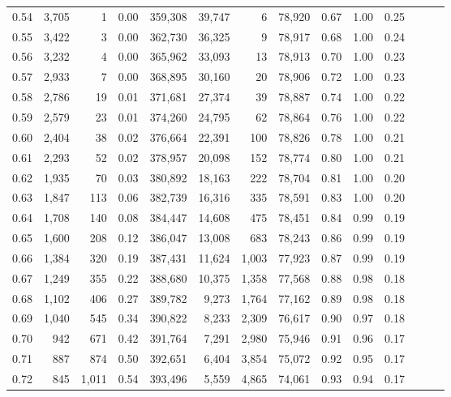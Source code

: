 \begin{tabular}{rrrrrrrrrrrrrr}
0.54 &  3,705 &      1 &  0.00 &  359,308 &   39,747 &       6 &  78,920 &  0.67 &  1.00 &      0.25 \\
0.55 &  3,422 &      3 &  0.00 &  362,730 &   36,325 &       9 &  78,917 &  0.68 &  1.00 &      0.24 \\
0.56 &  3,232 &      4 &  0.00 &  365,962 &   33,093 &      13 &  78,913 &  0.70 &  1.00 &      0.23 \\
0.57 &  2,933 &      7 &  0.00 &  368,895 &   30,160 &      20 &  78,906 &  0.72 &  1.00 &      0.23 \\
0.58 &  2,786 &     19 &  0.01 &  371,681 &   27,374 &      39 &  78,887 &  0.74 &  1.00 &      0.22 \\
0.59 &  2,579 &     23 &  0.01 &  374,260 &   24,795 &      62 &  78,864 &  0.76 &  1.00 &      0.22 \\
0.60 &  2,404 &     38 &  0.02 &  376,664 &   22,391 &     100 &  78,826 &  0.78 &  1.00 &      0.21 \\
0.61 &  2,293 &     52 &  0.02 &  378,957 &   20,098 &     152 &  78,774 &  0.80 &  1.00 &      0.21 \\
0.62 &  1,935 &     70 &  0.03 &  380,892 &   18,163 &     222 &  78,704 &  0.81 &  1.00 &      0.20 \\
0.63 &  1,847 &    113 &  0.06 &  382,739 &   16,316 &     335 &  78,591 &  0.83 &  1.00 &      0.20 \\
0.64 &  1,708 &    140 &  0.08 &  384,447 &   14,608 &     475 &  78,451 &  0.84 &  0.99 &      0.19 \\
0.65 &  1,600 &    208 &  0.12 &  386,047 &   13,008 &     683 &  78,243 &  0.86 &  0.99 &      0.19 \\
0.66 &  1,384 &    320 &  0.19 &  387,431 &   11,624 &   1,003 &  77,923 &  0.87 &  0.99 &      0.19 \\
0.67 &  1,249 &    355 &  0.22 &  388,680 &   10,375 &   1,358 &  77,568 &  0.88 &  0.98 &      0.18 \\
0.68 &  1,102 &    406 &  0.27 &  389,782 &    9,273 &   1,764 &  77,162 &  0.89 &  0.98 &      0.18 \\
0.69 &  1,040 &    545 &  0.34 &  390,822 &    8,233 &   2,309 &  76,617 &  0.90 &  0.97 &      0.18 \\
0.70 &    942 &    671 &  0.42 &  391,764 &    7,291 &   2,980 &  75,946 &  0.91 &  0.96 &      0.17 \\
0.71 &    887 &    874 &  0.50 &  392,651 &    6,404 &   3,854 &  75,072 &  0.92 &  0.95 &      0.17 \\
0.72 &    845 &  1,011 &  0.54 &  393,496 &    5,559 &   4,865 &  74,061 &  0.93 &  0.94 &      0.17 \\

\end{tabular}
